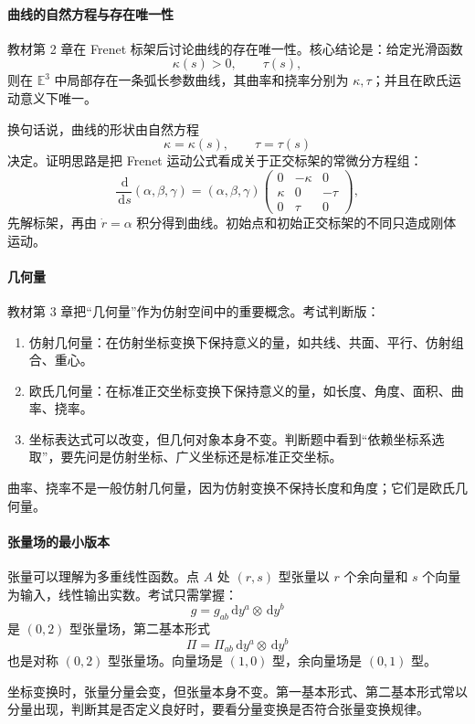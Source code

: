 \documentclass[UTF8,12pt,a4paper]{ctexart}
\newcommand{\E}{\mathbb E}
\newcommand{\dd}{\,\mathrm d}
\begin{document}
\paragraph{曲线的自然方程与存在唯一性}
教材第 2 章在 Frenet 标架后讨论曲线的存在唯一性。核心结论是：给定光滑函数
\[
\kappa(s)>0,\qquad \tau(s),
\]
则在 $\E^3$ 中局部存在一条弧长参数曲线，其曲率和挠率分别为 $\kappa,\tau$；并且在欧氏运动意义下唯一。

换句话说，曲线的形状由自然方程
\[
\kappa=\kappa(s),\qquad \tau=\tau(s)
\]
决定。证明思路是把 Frenet 运动公式看成关于正交标架的常微分方程组：
\[
\frac{\dd}{\dd s}(\alpha,\beta,\gamma)
=(\alpha,\beta,\gamma)
\begin{pmatrix}
0&-\kappa&0\\
\kappa&0&-\tau\\
0&\tau&0
\end{pmatrix},
\]
先解标架，再由 $\dot r=\alpha$ 积分得到曲线。初始点和初始正交标架的不同只造成刚体运动。

\paragraph{几何量}
教材第 3 章把“几何量”作为仿射空间中的重要概念。考试判断版：
\begin{enumerate}
\item 仿射几何量：在仿射坐标变换下保持意义的量，如共线、共面、平行、仿射组合、重心。
\item 欧氏几何量：在标准正交坐标变换下保持意义的量，如长度、角度、面积、曲率、挠率。
\item 坐标表达式可以改变，但几何对象本身不变。判断题中看到“依赖坐标系选取”，要先问是仿射坐标、广义坐标还是标准正交坐标。
\end{enumerate}

曲率、挠率不是一般仿射几何量，因为仿射变换不保持长度和角度；它们是欧氏几何量。

\paragraph{张量场的最小版本}
张量可以理解为多重线性函数。点 $A$ 处 $(r,s)$ 型张量以 $r$ 个余向量和 $s$ 个向量为输入，线性输出实数。考试只需掌握：
\[
g=g_{ab}\dd y^a\otimes\dd y^b
\]
是 $(0,2)$ 型张量场，第二基本形式
\[
\Pi=\Pi_{ab}\dd y^a\otimes\dd y^b
\]
也是对称 $(0,2)$ 型张量场。向量场是 $(1,0)$ 型，余向量场是 $(0,1)$ 型。

坐标变换时，张量分量会变，但张量本身不变。第一基本形式、第二基本形式常以分量出现，判断其是否定义良好时，要看分量变换是否符合张量变换规律。
\end{document}
